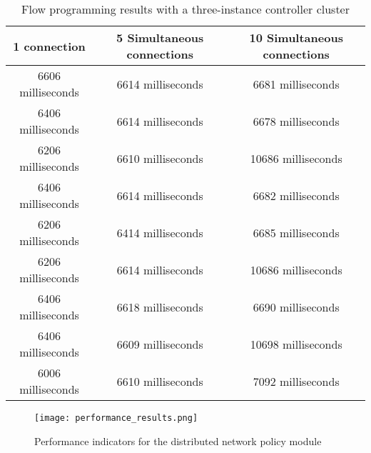 \begin{table}[h!]
	\begin{center}
		\begin{tabular}{ | c | c | c | }
			\rowcolor{HeaderRowColor}
			\hline
			\textbf{1 connection} & \textbf{5 Simultaneous connections} & \textbf{10 Simultaneous connections}\\
			\hline
			6606 milliseconds & 6614 milliseconds & 6681 milliseconds \\
			\hline
			6406 milliseconds & 6614 milliseconds & 6678 milliseconds \\
			\hline
			6206 milliseconds & 6610 milliseconds & 10686 milliseconds \\
			\hline
			6406 milliseconds & 6614 milliseconds & 6682 milliseconds \\
			\hline
			6206 milliseconds & 6414 milliseconds & 6685 milliseconds \\
			\hline
			6206 milliseconds & 6614 milliseconds & 10686 milliseconds \\
			\hline
			6406 milliseconds & 6618 milliseconds & 6690 milliseconds \\
			\hline
			6406 milliseconds & 6609 milliseconds & 10698 milliseconds \\
			\hline
			6006 milliseconds & 6610 milliseconds & 7092 milliseconds \\
			\hline
		\end{tabular}
		\caption{Flow programming results with a three-instance controller cluster}
		\label{table:perfomance-tests-3controllers}
	\end{center}
\end{table}
%
\begin{figure}
	\centering
	\texttt{[image: performance\_results.png]}
	\caption{Performance indicators for the distributed network policy module}
	\label{fig:performance}
\end{figure}
%
